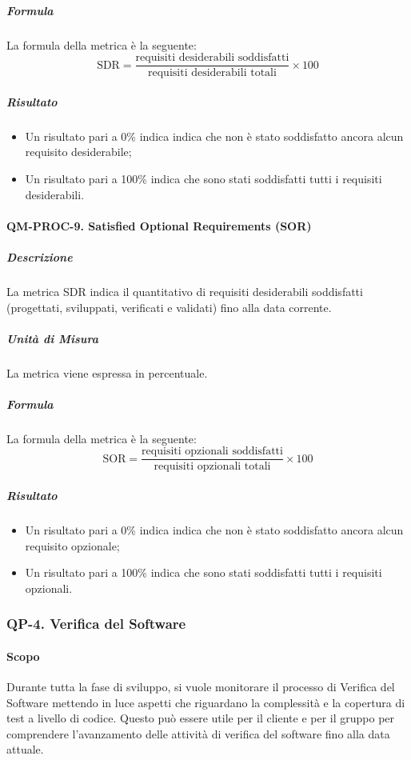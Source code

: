 			\subparagraph{Formula}
			La formula della metrica è la seguente:
			\[
				\text{SDR} = \frac{\text{requisiti desiderabili soddisfatti}}{\text{requisiti desiderabili totali}} \times 100
			\]

			\subparagraph{Risultato}
			\begin{itemize}
				\item Un risultato pari a 0\% indica indica che non è stato soddisfatto ancora alcun requisito desiderabile;
				\item Un risultato pari a 100\% indica che sono stati soddisfatti tutti i requisiti desiderabili.
			\end{itemize}

		\paragraph{QM-PROC-9. Satisfied Optional Requirements (SOR)}

			\subparagraph{Descrizione}
			La metrica SDR indica il quantitativo di requisiti desiderabili soddisfatti (progettati, sviluppati, verificati e validati) fino alla data corrente.

			\subparagraph{Unità di Misura}
			La metrica viene espressa in percentuale.

			\subparagraph{Formula}
			La formula della metrica è la seguente:
			\[
				\text{SOR} = \frac{\text{requisiti opzionali soddisfatti}}{\text{requisiti opzionali totali}} \times 100
			\]

			\subparagraph{Risultato}
			\begin{itemize}
				\item Un risultato pari a 0\% indica indica che non è stato soddisfatto ancora alcun requisito opzionale;
				\item Un risultato pari a 100\% indica che sono stati soddisfatti tutti i requisiti opzionali.
			\end{itemize}

	\subsubsection{QP-4. Verifica del Software}

		\paragraph{Scopo}

			Durante tutta la fase di sviluppo, si vuole monitorare il processo di Verifica del Software mettendo in luce aspetti che riguardano la complessità e la copertura di test a livello di codice. Questo può essere utile per il cliente e per il gruppo per comprendere l'avanzamento delle attività di verifica del software fino alla data attuale.

